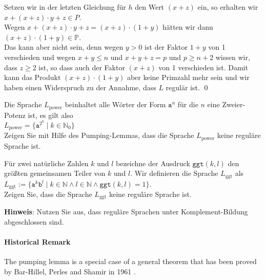 Setzen wir in der letzten Gleichung f\"ur $h$ den Wert $(x + z)$ ein, so erhalten wir
\\[0.2cm]
\hspace*{1.3cm}
$x + (x + z)\cdot y + z \in P$.
\\[0.2cm]
Wegen $x + (x + z)\cdot y + z = (x + z) \cdot (1 + y)$ h\"atten wir dann
\\[0.2cm]
\hspace*{1.3cm}
$(x + z) \cdot (1 + y) \in \mathbb{P}$.
\\[0.2cm]
Das kann aber nicht sein, denn wegen $y > 0$ ist der Faktor $1 + y$ von 1
verschieden und wegen $x + y \leq n$ und $x + y + z = p$ und $p \geq n + 2$ wissen wir, dass
$z \geq 2$ ist, so dass auch der Faktor $(x + z)$ von 1 verschieden ist.  Damit kann das Produkt
$(x + z) \cdot (1 + y)$ aber keine Primzahl mehr sein und wir haben einen Widerspruch zu der
Annahme, dass $L$ regul\"ar ist. \qed


\exercise
Die Sprache $L_{\mathrm{power}}$ beinhaltet alle W\"orter der Form $\mathtt{a}^n$ f\"ur die $n$ eine
Zweier-Potenz ist, es gilt also
\\[0.2cm]
\hspace*{1.3cm}
$L_{\mathrm{power}} = \bigl\{ \mathtt{a}^{2^k} \mid k \in \mathbb{N}_0 \bigr\}$
\\[0.2cm]
Zeigen Sie mit Hilfe des Pumping-Lemmas, dass die Sprache $L_{\mathrm{power}}$ keine regul\"are Sprache ist.
\eox

\exercise
F\"ur zwei nat\"urliche Zahlen $k$ und $l$ bezeichne der Ausdruck $\mathtt{ggt}(k, l)$ den gr\"o{\ss}ten
gemeinsamen Teiler von $k$ und $l$.  Wir definieren die Sprache $L_{\mathrm{ggt}}$ als
\\[0.2cm]
\hspace*{1.3cm}
$L_{\mathrm{ggt}} := \bigl\{ \mathtt{a}^k\mathtt{b}^l \mid k \in \mathbb{N} \wedge l \in \mathbb{N} \wedge \mathtt{ggt}(k, l) = 1 \bigr\}$.
\\[0.2cm]
Zeigen Sie, dass die Sprache $L_{\mathrm{ggt}}$ keine regul\"are Sprache ist.
\vspace{0.2cm}

\noindent
\textbf{Hinweis}:  Nutzen Sie aus, dass regul\"are Sprachen unter Komplement-Bildung abgeschlossen sind.
\eox


\paragraph{Historical Remark}
The pumping lemma is a special case of a general theorem that has been proved by Bar-Hillel, Perles and
Shamir in 1961 \cite{barhillel:1961}.


